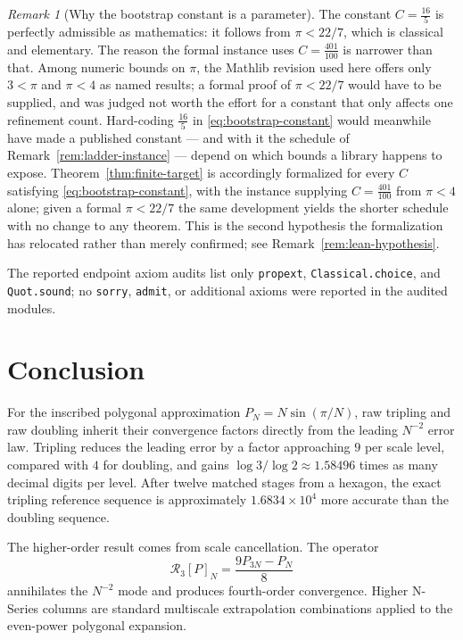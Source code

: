 \documentclass[12pt]{article}
\theoremstyle{definition}
\theoremstyle{remark}
\newtheorem{remark}[theorem]{Remark}
\newcommand{\Rop}{\mathcal{R}}
\begin{document}
\begin{remark}[Why the bootstrap constant is a parameter]
\label{rem:lean-constant}
The constant $C=\tfrac{16}{5}$ is perfectly admissible as mathematics: it
follows from $\pi<22/7$, which is classical and elementary.  The reason the
formal instance uses $C=\tfrac{401}{100}$ is narrower than that.  Among numeric
bounds on $\pi$, the Mathlib revision used here offers only $3<\pi$ and
$\pi<4$ as named results; a formal proof of $\pi<22/7$ would have to be
supplied, and was judged not worth the effort for a constant that only affects
one refinement count.  Hard-coding $\tfrac{16}{5}$ in
\eqref{eq:bootstrap-constant} would meanwhile have made a published constant ---
and with it the schedule of Remark~\ref{rem:ladder-instance} --- depend on which
bounds a library happens to expose.  Theorem~\ref{thm:finite-target} is
accordingly formalized for every $C$ satisfying \eqref{eq:bootstrap-constant},
with the instance supplying $C=\tfrac{401}{100}$ from $\pi<4$ alone; given a
formal $\pi<22/7$ the same development yields the shorter schedule with no
change to any theorem.  This is the second hypothesis the formalization has
relocated rather than merely confirmed; see
Remark~\ref{rem:lean-hypothesis}.
\end{remark}

The reported endpoint axiom audits list only \texttt{propext}, \texttt{Classical.choice},
and \texttt{Quot.sound}; no \texttt{sorry}, \texttt{admit}, or additional axioms were reported
in the audited modules.


\section{Conclusion}

For the inscribed polygonal approximation
$P_N=N\sin(\pi/N)$, raw tripling and raw doubling inherit their convergence
factors directly from the leading $N^{-2}$ error law.  Tripling reduces the
leading error by a factor approaching $9$ per scale level, compared with $4$
for doubling, and gains $\log 3/\log 2\approx1.58496$ times as many decimal
digits per level.  After twelve matched stages from a hexagon, the exact
tripling reference sequence is approximately $1.6834\times10^4$ more accurate
than the doubling sequence.

The higher-order result comes from scale cancellation.  The operator
\[
  \Rop_3[P]_N=\frac{9P_{3N}-P_N}{8}
\]
annihilates the $N^{-2}$ mode and produces fourth-order convergence.  Higher
N-Series columns are standard multiscale extrapolation combinations applied to
the even-power polygonal expansion.
\end{document}
